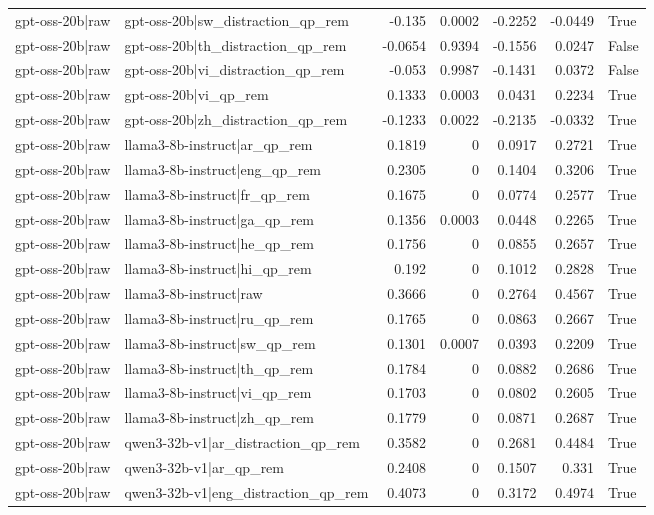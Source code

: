 \begin{table}
\begin{tabular}{l l r r r r l}
gpt-oss-20b|raw & gpt-oss-20b|sw_distraction_qp_rem & -0.135 & 0.0002 & -0.2252 & -0.0449 & True \\
gpt-oss-20b|raw & gpt-oss-20b|th_distraction_qp_rem & -0.0654 & 0.9394 & -0.1556 & 0.0247 & False \\
gpt-oss-20b|raw & gpt-oss-20b|vi_distraction_qp_rem & -0.053 & 0.9987 & -0.1431 & 0.0372 & False \\
gpt-oss-20b|raw & gpt-oss-20b|vi_qp_rem & 0.1333 & 0.0003 & 0.0431 & 0.2234 & True \\
gpt-oss-20b|raw & gpt-oss-20b|zh_distraction_qp_rem & -0.1233 & 0.0022 & -0.2135 & -0.0332 & True \\
gpt-oss-20b|raw & llama3-8b-instruct|ar_qp_rem & 0.1819 & 0 & 0.0917 & 0.2721 & True \\
gpt-oss-20b|raw & llama3-8b-instruct|eng_qp_rem & 0.2305 & 0 & 0.1404 & 0.3206 & True \\
gpt-oss-20b|raw & llama3-8b-instruct|fr_qp_rem & 0.1675 & 0 & 0.0774 & 0.2577 & True \\
gpt-oss-20b|raw & llama3-8b-instruct|ga_qp_rem & 0.1356 & 0.0003 & 0.0448 & 0.2265 & True \\
gpt-oss-20b|raw & llama3-8b-instruct|he_qp_rem & 0.1756 & 0 & 0.0855 & 0.2657 & True \\
gpt-oss-20b|raw & llama3-8b-instruct|hi_qp_rem & 0.192 & 0 & 0.1012 & 0.2828 & True \\
gpt-oss-20b|raw & llama3-8b-instruct|raw & 0.3666 & 0 & 0.2764 & 0.4567 & True \\
gpt-oss-20b|raw & llama3-8b-instruct|ru_qp_rem & 0.1765 & 0 & 0.0863 & 0.2667 & True \\
gpt-oss-20b|raw & llama3-8b-instruct|sw_qp_rem & 0.1301 & 0.0007 & 0.0393 & 0.2209 & True \\
gpt-oss-20b|raw & llama3-8b-instruct|th_qp_rem & 0.1784 & 0 & 0.0882 & 0.2686 & True \\
gpt-oss-20b|raw & llama3-8b-instruct|vi_qp_rem & 0.1703 & 0 & 0.0802 & 0.2605 & True \\
gpt-oss-20b|raw & llama3-8b-instruct|zh_qp_rem & 0.1779 & 0 & 0.0871 & 0.2687 & True \\
gpt-oss-20b|raw & qwen3-32b-v1|ar_distraction_qp_rem & 0.3582 & 0 & 0.2681 & 0.4484 & True \\
gpt-oss-20b|raw & qwen3-32b-v1|ar_qp_rem & 0.2408 & 0 & 0.1507 & 0.331 & True \\
gpt-oss-20b|raw & qwen3-32b-v1|eng_distraction_qp_rem & 0.4073 & 0 & 0.3172 & 0.4974 & True \\

\end{tabular}
\end{table}
